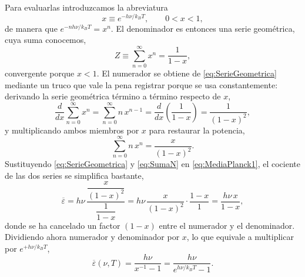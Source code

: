             Para evaluarlas introduzcamos la abreviatura
            \begin{equation}\label{eq:VariableX}
                x \equiv e^{-h\nu/k_{B}T}, \qquad 0 < x < 1 ,
            \end{equation}
            de manera que $e^{-nh\nu/k_{B}T} = x^{n}$. El denominador es entonces una serie geométrica, cuya suma conocemos,
            \begin{equation}\label{eq:SerieGeometrica}
                Z \equiv \sum_{n=0}^{\infty}x^{n} = \frac{1}{1-x},
            \end{equation}
            convergente porque $x<1$. El numerador se obtiene de \eqref{eq:SerieGeometrica} mediante un truco que vale la pena registrar porque se usa constantemente: derivando la serie geométrica término a término respecto de $x$,
            \begin{equation}\label{eq:DerivadaSerie}
                \frac{d}{dx}\sum_{n=0}^{\infty}x^{n} = \sum_{n=0}^{\infty}n\,x^{n-1} = \frac{d}{dx}\left(\frac{1}{1-x}\right) = \frac{1}{(1-x)^{2}},
            \end{equation}
            y multiplicando ambos miembros por $x$ para restaurar la potencia,
            \begin{equation}\label{eq:SumaN}
                \sum_{n=0}^{\infty}n\,x^{n} = \frac{x}{(1-x)^{2}} .
            \end{equation}
            Sustituyendo \eqref{eq:SerieGeometrica} y \eqref{eq:SumaN} en \eqref{eq:MediaPlanck1}, el cociente de las dos series se simplifica bastante,
            \begin{equation}\label{eq:MediaPlanck2}
                \overline{\varepsilon} = h\nu\,\frac{\dfrac{x}{(1-x)^{2}}}{\dfrac{1}{1-x}}
                = h\nu\,\frac{x}{(1-x)^{2}}\cdot\frac{1-x}{1} = \frac{h\nu\,x}{1-x},
            \end{equation}
            donde se ha cancelado un factor $(1-x)$ entre el numerador y el denominador. Dividiendo ahora numerador y denominador por $x$, lo que equivale a multiplicar por $e^{+h\nu/k_{B}T}$,
            \begin{equation}\label{eq:MediaPlanck3}
                \boxed{\;\overline{\varepsilon}(\nu,T) = \frac{h\nu}{x^{-1}-1} = \frac{h\nu}{e^{h\nu/k_{B}T}-1} .\;}
            \end{equation}

